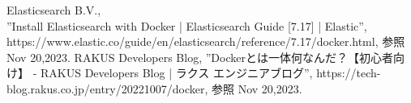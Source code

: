 \begin{thebibliography}{99}

Elasticsearch B.V.,\\ ”Install Elasticsearch with Docker | Elasticsearch Guide [7.17] | Elastic”, https://www.elastic.co/guide/en/elasticsearch/reference/7.17/docker.html, 参照 Nov 20,2023.
RAKUS Developers Blog, ”Dockerとは一体何なんだ？【初心者向け】 - RAKUS Developers Blog | ラクス エンジニアブログ”, https://tech-blog.rakus.co.jp/entry/20221007/docker, 参照 Nov 20,2023.
\end{thebibliography}
